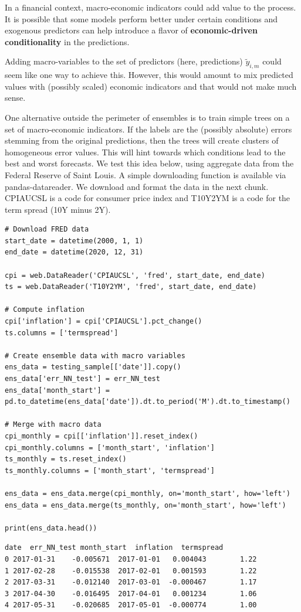 In a financial context, macro-economic indicators could add value to the process. It is possible that some models perform better under certain conditions and exogenous predictors can help introduce a flavor of \textbf{economic-driven conditionality} in the predictions.

Adding macro-variables to the set of predictors (here, predictions) $\tilde{y}_{i,m}$ could seem like one way to achieve this. However, this would amount to mix predicted values with (possibly scaled) economic indicators and that would not make much sense.

One alternative outside the perimeter of ensembles is to train simple trees on a set of macro-economic indicators. If the labels are the (possibly absolute) errors stemming from the original predictions, then the trees will create clusters of homogeneous error values. This will hint towards which conditions lead to the best and worst forecasts.
We test this idea below, using aggregate data from the Federal Reserve of Saint Louis. A simple downloading function is available via pandas-datareader. We download and format the data in the next chunk. CPIAUCSL is a code for consumer price index and T10Y2YM is a code for the term spread (10Y minus 2Y).

\begin{verbatim}
# Download FRED data
start_date = datetime(2000, 1, 1)
end_date = datetime(2020, 12, 31)

cpi = web.DataReader('CPIAUCSL', 'fred', start_date, end_date)
ts = web.DataReader('T10Y2YM', 'fred', start_date, end_date)

# Compute inflation
cpi['inflation'] = cpi['CPIAUCSL'].pct_change()
ts.columns = ['termspread']

# Create ensemble data with macro variables
ens_data = testing_sample[['date']].copy()
ens_data['err_NN_test'] = err_NN_test
ens_data['month_start'] = pd.to_datetime(ens_data['date']).dt.to_period('M').dt.to_timestamp()

# Merge with macro data
cpi_monthly = cpi[['inflation']].reset_index()
cpi_monthly.columns = ['month_start', 'inflation']
ts_monthly = ts.reset_index()
ts_monthly.columns = ['month_start', 'termspread']

ens_data = ens_data.merge(cpi_monthly, on='month_start', how='left')
ens_data = ens_data.merge(ts_monthly, on='month_start', how='left')

print(ens_data.head())
\end{verbatim}

\begin{verbatim}
date  err_NN_test month_start  inflation  termspread
0 2017-01-31    -0.005671  2017-01-01   0.004043        1.22
1 2017-02-28    -0.015538  2017-02-01   0.001593        1.22
2 2017-03-31    -0.012140  2017-03-01  -0.000467        1.17
3 2017-04-30    -0.016495  2017-04-01   0.001234        1.06
4 2017-05-31    -0.020685  2017-05-01  -0.000774        1.00
\end{verbatim}

